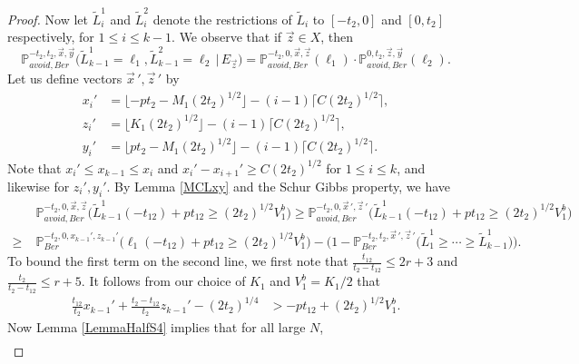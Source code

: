 \begin{proof}
	Now let $\tilde{L}_i^1$ and $\tilde{L}_i^2$ denote the restrictions of $\tilde{L}_i$ to $[-t_2,0]$ and $[0,t_2]$ respectively, for $1\leq i\leq k-1$. We observe that if $\vec{z}\in X$, then
	\begin{equation}\label{5.10split}
	\mathbb{P}^{-t_2,t_2,\vec{x},\vec{y}}_{avoid,Ber}\big(\tilde{L}^1_{k-1} = \ell_1, \tilde{L}^2_{k-1} = \ell_2 \, |\, E_{\vec{z}}\big) = \mathbb{P}^{-t_2,0,\vec{x},\vec{z}}_{avoid,Ber}(\ell_1)\cdot\mathbb{P}^{0,t_2,\vec{z},\vec{y}}_{avoid,Ber}(\ell_2).
	\end{equation}
	Let us define vectors $\vec{x}\,', \vec{z}\,'$ by
	\begin{align*}
	x_i' &= \lfloor -pt_2 - M_1(2t_2)^{1/2}\rfloor - (i-1)\lceil C(2t_2)^{1/2}\rceil,\\
	z_i' &= \lfloor K_1(2t_2)^{1/2}\rfloor - (i-1)\lceil C(2t_2)^{1/2}\rceil,\\
	y_i' &= \lfloor pt_2 - M_1(2t_2)^{1/2}\rfloor - (i-1)\lceil C(2t_2)^{1/2}\rceil.
	\end{align*}
	Note that $x_i' \leq x_{k-1} \leq x_i$ and $x_i' - x_{i+1}' \geq C(2t_2)^{1/2}$ for $1\leq i\leq k$, and likewise for $z_i',y_i'$. By Lemma \ref{MCLxy} and the Schur Gibbs property, we have
	\begin{equation}\label{5.10separate}
	\begin{split}
	&\mathbb{P}^{-t_2,0,\vec{x},\vec{z}}_{avoid,Ber}\Big(\tilde{L}^1_{k-1}(-t_{12}) + pt_{12} \geq (2t_2)^{1/2}V_1^b\Big) \geq \mathbb{P}^{-t_2,0,\vec{x}\,',\vec{z}\,'}_{avoid,Ber}\Big(\tilde{L}^1_{k-1}(-t_{12}) + pt_{12} \geq (2t_2)^{1/2}V_1^b\Big)\\ \geq \; & \mathbb{P}^{-t_2,0,x_{k-1}',z_{k-1}'}_{Ber}\Big(\ell_1(-t_{12}) + pt_{12} \geq (2t_2)^{1/2}V_1^b\Big) - \big( 1 - \mathbb{P}^{-t_2,t_2,\vec{x}\,',\vec{z}\,'}_{Ber}\big(\tilde{L}^1_1 \geq \cdots \geq \tilde{L}_{k-1}^1\big)\big).
	\end{split}
	\end{equation} 
	To bound the first term on the second line, we first note that $\frac{t_{12}}{t_2-t_{12}} \leq 2r+3$ and $\frac{t_2}{t_2-t_{12}} \leq r+5$. It follows from our choice of $K_1$ and $V_1^b = K_1/2$ that 
	\begin{align*}
	\frac{t_{12}}{t_2}x_{k-1}' + \frac{t_2-t_{12}}{t_2}z_{k-1}' - (2t_2)^{1/4} &> -pt_{12} + (2t_2)^{1/2}V_1^b.
	\end{align*}
	Now Lemma \ref{LemmaHalfS4} implies that for all large $N$,
	\begin{equation}\label{5.10third}
	\begin{split}

\end{split}
\end{equation}
\end{proof}
